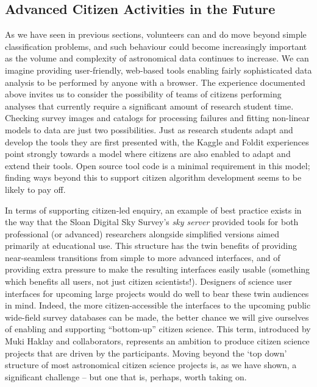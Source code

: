 \documentclass{ar2e}
\begin{document}

\subsection{Advanced Citizen Activities in the Future}

As we have seen in previous sections, volunteers can and do move beyond simple
classification problems, and such behaviour could become increasingly
important as the volume and complexity of astronomical data continues to
increase.  We can imagine providing user-friendly, web-based tools enabling 
fairly sophisticated data analysis to be performed by anyone with a browser.
The experience documented above invites us to consider the possibility of
teams of citizens  performing analyses that currently require a significant
amount of research student time.  Checking survey images and catalogs  for
processing failures and fitting non-linear models to data are just two
possibilities. Just as research students adapt and develop the tools they are
first presented with, the Kaggle and Foldit experiences point strongly towards
a model where citizens are also enabled to adapt and extend their tools. Open
source tool code is a minimal requirement in this model; finding ways beyond
this to support citizen algorithm development seems to be likely to pay off.

In terms of supporting citizen-led enquiry, an example of best practice exists
in the way that the Sloan Digital Sky Survey's \textit{sky server} provided
tools for both professional (or advanced) researchers alongside simplified
versions aimed primarily at educational use. This structure has the twin
benefits of providing near-seamless transitions from simple to more advanced
interfaces, and of providing extra pressure to make the resulting interfaces
easily usable  (something which benefits all users, not just citizen
scientists!). Designers of science user interfaces for upcoming large projects
would do well to bear these twin audiences in mind. Indeed, the more
citizen-accessible the interfaces to the upcoming public wide-field survey
databases can be made, the better chance we will give ourselves of enabling and
supporting ``bottom-up'' citizen science.   This term, introduced by Muki Haklay
and collaborators, represents an ambition to produce citizen science projects
that are driven by the participants. Moving beyond the `top down' structure of
most astronomical citizen science projects is, as we have shown, a significant
challenge -- but one that is, perhaps, worth taking on.  
\end{document}
